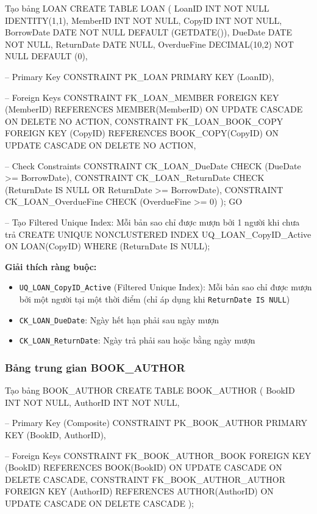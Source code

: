 \documentclass[12pt,a4paper]{article}
\begin{document}
\begin{sqlcode}{Tạo bảng LOAN}
CREATE TABLE LOAN (
    LoanID         INT             NOT NULL   IDENTITY(1,1),
    MemberID       INT             NOT NULL,
    CopyID         INT             NOT NULL,
    BorrowDate     DATE            NOT NULL   DEFAULT (GETDATE()),
    DueDate        DATE            NOT NULL,
    ReturnDate     DATE            NULL,
    OverdueFine    DECIMAL(10,2)   NOT NULL   DEFAULT (0),

    -- Primary Key
    CONSTRAINT PK_LOAN PRIMARY KEY (LoanID),

    -- Foreign Keys
    CONSTRAINT FK_LOAN_MEMBER FOREIGN KEY (MemberID)
        REFERENCES MEMBER(MemberID)
        ON UPDATE CASCADE
        ON DELETE NO ACTION,
    CONSTRAINT FK_LOAN_BOOK_COPY FOREIGN KEY (CopyID)
        REFERENCES BOOK_COPY(CopyID)
        ON UPDATE CASCADE
        ON DELETE NO ACTION,

    -- Check Constraints
    CONSTRAINT CK_LOAN_DueDate
        CHECK (DueDate >= BorrowDate),
    CONSTRAINT CK_LOAN_ReturnDate
        CHECK (ReturnDate IS NULL OR ReturnDate >= BorrowDate),
    CONSTRAINT CK_LOAN_OverdueFine
        CHECK (OverdueFine >= 0)
);
GO

-- Tạo Filtered Unique Index: Mỗi bản sao chỉ được mượn bởi 1 người khi chưa trả
CREATE UNIQUE NONCLUSTERED INDEX UQ_LOAN_CopyID_Active
ON LOAN(CopyID)
WHERE (ReturnDate IS NULL);
\end{sqlcode}

\textbf{Giải thích ràng buộc:}
\begin{itemize}
    \item \texttt{UQ\_LOAN\_CopyID\_Active} (Filtered Unique Index): Mỗi bản sao chỉ được mượn bởi một người tại một thời điểm (chỉ áp dụng khi \texttt{ReturnDate IS NULL})
    \item \texttt{CK\_LOAN\_DueDate}: Ngày hết hạn phải sau ngày mượn
    \item \texttt{CK\_LOAN\_ReturnDate}: Ngày trả phải sau hoặc bằng ngày mượn
\end{itemize}

\subsubsection{Bảng trung gian BOOK\_AUTHOR}

\begin{sqlcode}{Tạo bảng BOOK\_AUTHOR}
CREATE TABLE BOOK_AUTHOR (
    BookID         INT   NOT NULL,
    AuthorID       INT   NOT NULL,

    -- Primary Key (Composite)
    CONSTRAINT PK_BOOK_AUTHOR PRIMARY KEY (BookID, AuthorID),

    -- Foreign Keys
    CONSTRAINT FK_BOOK_AUTHOR_BOOK FOREIGN KEY (BookID)
        REFERENCES BOOK(BookID)
        ON UPDATE CASCADE
        ON DELETE CASCADE,
    CONSTRAINT FK_BOOK_AUTHOR_AUTHOR FOREIGN KEY (AuthorID)
        REFERENCES AUTHOR(AuthorID)
        ON UPDATE CASCADE
        ON DELETE CASCADE
);
\end{sqlcode}
\end{document}
